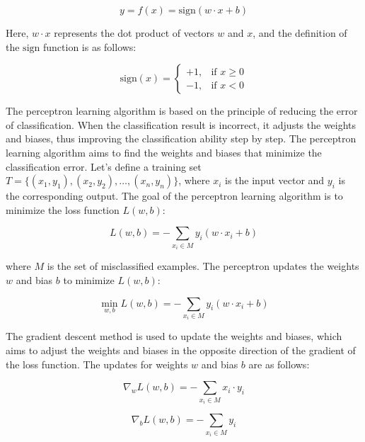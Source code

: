 \documentclass[12pt,a4paper]{report}
\begin{document}
\begin{equation}
    y = f(x) = \text{sign}(w \cdot x + b)
\end{equation}

Here, \( w \cdot x \) represents the dot product of vectors \( w \) and \( x \), and the definition of the \( \text{sign} \) function is as follows:

\begin{equation}
    \text{sign}(x) = 
\begin{cases}
+1, & \text{if } x \geq 0 \\
-1, & \text{if } x < 0
\end{cases}
\end{equation}


The perceptron learning algorithm is based on the principle of reducing the error of classification. When the classification result is incorrect, it adjusts the weights and biases, thus improving the classification ability step by step. The perceptron learning algorithm aims to find the weights and biases that minimize the classification error. Let's define a training set \( T = \{(x_1, y_1), (x_2, y_2), \ldots, (x_n, y_n)\} \), where \( x_i \) is the input vector and \( y_i \) is the corresponding output. The goal of the perceptron learning algorithm is to minimize the loss function \( L(w,b) \):

\begin{equation}
L(w,b) = - \sum_{x_i \in M} y_i (w \cdot x_i + b)
\end{equation}

where \( M \) is the set of misclassified examples. The perceptron updates the weights \( w \) and bias \( b \) to minimize \( L(w,b) \):

\begin{equation}
\min_{w,b} L(w,b) = - \sum_{x_i \in M} y_i (w \cdot x_i + b)
\end{equation}

The gradient descent method is used to update the weights and biases, which aims to adjust the weights and biases in the opposite direction of the gradient of the loss function. The updates for weights \( w \) and bias \( b \) are as follows:

\begin{equation}
\nabla_w L(w,b) = - \sum_{x_i \in M} x_i \cdot y_i
\end{equation}

\begin{equation}
\nabla_b L(w,b) = - \sum_{x_i \in M} y_i
\end{equation}
\end{document}
